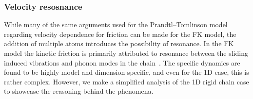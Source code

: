





\subsubsection{Velocity resosnance} %



While many of the same arguments used for the Prandtl–Tomlinson model regarding velocity dependence for friction can be made for the \acrshort{FK} model, the addition of multiple atoms introduces the possibility of resonance. In the \acrshort{FK} model the kinetic friction is primarily attributed to resonance between the sliding induced vibrations and phonon modes in the chain~\cite{FK2D}. The specific dynamics are found to be highly model and dimension specific, and even for the 1D case, this is rather complex. However, we make a simplified analysis of the 1D rigid chain case to showcase the reasoning behind the phenomena.


